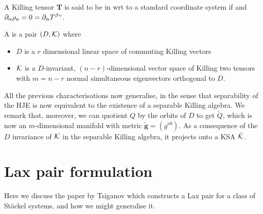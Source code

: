 \documentclass{article}
\begin{document}
\begin{definition}
A Killing tensor $\bm{T}$ is said to be in  wrt to a standard coordinate system if  
and $\partial_\alpha \rho_a = 0 = \partial_\alpha T^{\beta \gamma}$. 
\end{definition}

\begin{definition}
A  is a pair $(D,\mathcal{K})$ where 
\begin{itemize}
    \item $D$ is a $r$ dimensional linear space of commuting Killing vectors 
    \item $\mathcal{K}$ is a $D$-invariant, $(n-r)$-dimensional vector space of Killing two tensors with $m=n-r$ normal simultaneous eigenvectors orthogonal to $D$. 
\end{itemize}
\end{definition}

All the previous characterisations now generalise, in the sense that separability of the HJE is now equivalent to the existence of a separable Killing algebra. We remark that, moreover, we can quotient $Q$ by the orbits of $D$ to get $\tilde{Q}$, which is now an $m$-dimensional manifold with metric $\tilde{\bm{g}} = (g^{ab})$. As a consequence of the $D$ invariance of $\mathcal{K}$ in the separable Killing algebra, it projects onto a KSA $\tilde{\mathcal{K}}$. 

\section{Lax pair formulation}
Here we discuss the paper by Tsiganov \cite{Tsiganov1999} which constructs a Lax pair for a class of St\"ackel systems, and how we might generalise it. 





\end{document}
